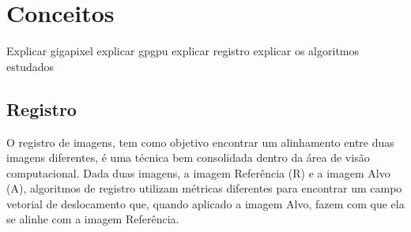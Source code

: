 \chapter{Conceitos}
\label{cap:conceitos}



Explicar gigapixel
explicar gpgpu
explicar registro
explicar os algoritmos estudados

\section{Registro}
\label{sec:fundamentos}

    O registro de imagens, tem como objetivo encontrar um alinhamento entre duas imagens diferentes, é uma técnica
bem consolidada dentro da área de visão computacional. Dada duas imagens, a imagem Referência (R) e a imagem Alvo (A),
algoritmos de registro utilizam métricas diferentes para encontrar um campo vetorial de deslocamento que, quando aplicado
a imagem Alvo, fazem com que ela se alinhe com a imagem Referência.

